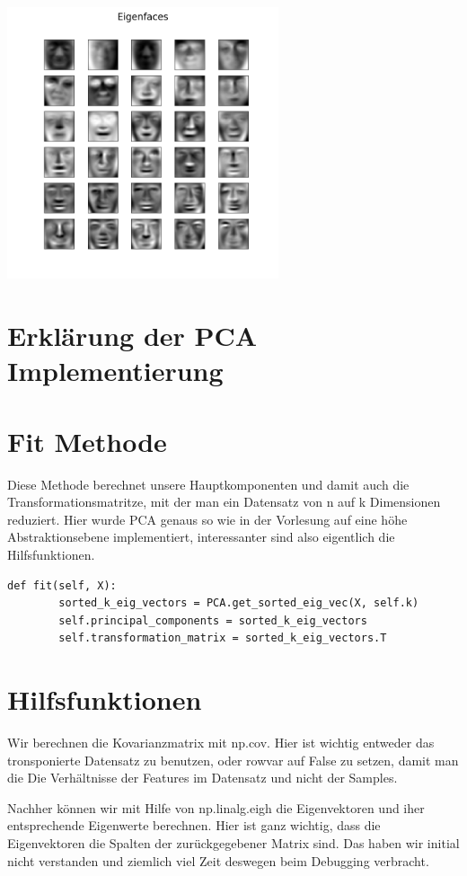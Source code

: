 \includegraphics[height=8cm]{./eigenfaces.png}

\section*{Erklärung der PCA Implementierung}

\section*{Fit Methode}

Diese Methode berechnet unsere Hauptkomponenten und damit auch die Transformationsmatritze, mit der man
ein Datensatz von n auf k Dimensionen reduziert. Hier wurde PCA genaus so wie in der Vorlesung auf eine höhe
Abstraktionsebene implementiert, interessanter sind also eigentlich die Hilfsfunktionen.


\begin{lstlisting}[style=py]
    def fit(self, X):
        sorted_k_eig_vectors = PCA.get_sorted_eig_vec(X, self.k)
        self.principal_components = sorted_k_eig_vectors
        self.transformation_matrix = sorted_k_eig_vectors.T
\end{lstlisting}

\section*{Hilfsfunktionen}

Wir berechnen die Kovarianzmatrix mit np.cov. Hier ist wichtig entweder das tronsponierte Datensatz
zu benutzen, oder rowvar auf False zu setzen, damit man die Die Verhältnisse der Features im Datensatz und nicht
der Samples.

Nachher können wir mit Hilfe von np.linalg.eigh die Eigenvektoren und iher entsprechende Eigenwerte berechnen.
Hier ist ganz wichtig, dass die Eigenvektoren die Spalten der zurückgegebener Matrix sind. Das haben wir
initial nicht verstanden und ziemlich viel Zeit deswegen beim Debugging verbracht.

